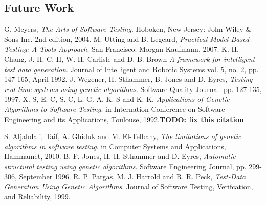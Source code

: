 \documentclass[runningheads]{llncs}
\begin{document}
\subsection{Future Work}

\newpage
\begin{thebibliography}{9}

  G. Meyers,
  \emph{The Arts of Software Testing}.
  Hoboken, New Jersey: John Wiley \& Sons Inc.
  2nd edition,
   2004.
  M. Utting and B. Legeard,
  \emph{Practical Model-Based Testing: A Tools Approach}.
  San Francisco: Morgan-Kaufmann.
   2007.
  	K.-H. Chang, J. H. C. II, W. H. Carlisle and D. B. Brown
  \emph{A framework for intelligent test data generation}.
  Journal of Intelligent and Robotic Systems
  vol. 5, 
  no. 2, 
  pp. 147-165, 
  April 1992.
  	J. Wegener, H. Sthammer, B. Jones and D. Eyres,
  \emph{Testing real-time systems using genetic algorithms}.
  Software Quality Journal.
  pp. 127-135, 
  1997.    
  X. S, E. C, S. C, L. G. A, K. S and K. K,
  \emph{Applications of Genetic Algorithms to Software Testing}.
  in Internation Conference on Software Engineering and its Applications, 
  Toulouse, 
  1992.\textbf{TODO: fix this citation}
  
  	S. Aljahdali, Taif, A. Ghiduk and M. El-Telbany,
  \emph{The limitations of genetic algorithms in software testing}.
  in Computer Systems and Applications, 
  Hammamet, 
  2010. 
  	B. F. Jones, H. H. Sthammer and D. Eyres,
  \emph{Automatic structural testing using genetic algorithms}.
  Software Engineering Journal, 
  pp. 299-306, 
  September 1996.  
  	R. P. Pargas, M. J. Harrold and R. R. Peck,
  \emph{Test-Data Generation Using Genetic Algorithms}.
  Journal of Software Testing, Verifcation, and Reliability, 
  1999.      
\end{thebibliography}
\end{document}
